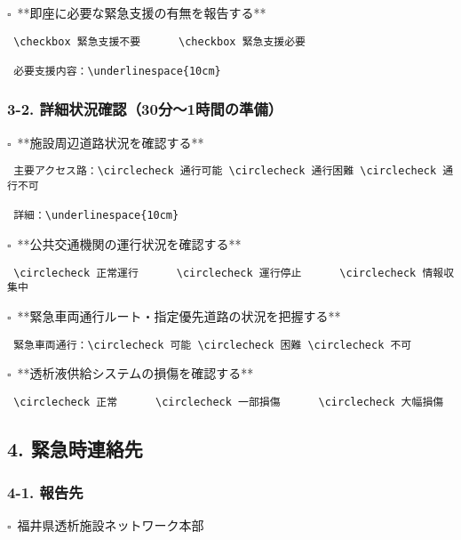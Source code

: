 \documentclass[
  japanese,
]{jarticle}
\newcommand{\checkbox}{$\square$\ }
\newcommand{\underlinespace}[1]{\underline{\hspace{#1}}}
\newcommand{\circlecheck}{$\bigcirc$\ }
\begin{document}
\checkbox **即座に必要な緊急支援の有無を報告する**

\begin{verbatim}
 \checkbox 緊急支援不要      \checkbox 緊急支援必要

 必要支援内容：\underlinespace{10cm}
\end{verbatim}

\subsubsection{3-2.
詳細状況確認（30分～1時間の準備）}\label{ux8a73ux7d30ux72b6ux6cc1ux78baux8a8d30ux52061ux6642ux9593ux306eux6e96ux5099}

\checkbox **施設周辺道路状況を確認する**

\begin{verbatim}
 主要アクセス路：\circlecheck 通行可能 \circlecheck 通行困難 \circlecheck 通行不可

 詳細：\underlinespace{10cm}
\end{verbatim}

\checkbox **公共交通機関の運行状況を確認する**

\begin{verbatim}
 \circlecheck 正常運行      \circlecheck 運行停止      \circlecheck 情報収集中
\end{verbatim}

\checkbox **緊急車両通行ルート・指定優先道路の状況を把握する**

\begin{verbatim}
 緊急車両通行：\circlecheck 可能 \circlecheck 困難 \circlecheck 不可
\end{verbatim}

\checkbox **透析液供給システムの損傷を確認する**

\begin{verbatim}
 \circlecheck 正常      \circlecheck 一部損傷      \circlecheck 大幅損傷
\end{verbatim}

\subsection{4. 緊急時連絡先}\label{ux7dcaux6025ux6642ux9023ux7d61ux5148}

\subsubsection{4-1. 報告先}\label{ux5831ux544aux5148}

\checkbox 福井県透析施設ネットワーク本部
\end{document}

